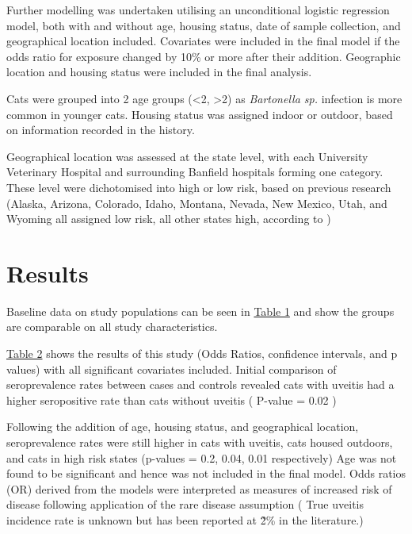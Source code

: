 \documentclass[11pt,twocolumn]{article}
\begin{document}
		Further modelling was undertaken utilising an unconditional logistic regression model, both with and without age, housing status, date of sample collection, and geographical location included. 
		Covariates were included in the final model if the odds ratio for exposure changed by 10\% or more after their addition.
		Geographic location and housing status were included in the final analysis.


		Cats were grouped into 2 age groups (\textless 2, \textgreater 2) as \emph{Bartonella sp.} infection is more common in younger cats.
		Housing status was assigned indoor or outdoor, based on information recorded in the history.


		Geographical location was assessed at the state level, with each University Veterinary Hospital and surrounding Banfield hospitals forming one category.
		These level were dichotomised into high or low risk, based on previous research (Alaska, Arizona, Colorado, Idaho, Montana, Nevada, New Mexico, Utah, and Wyoming all assigned low risk, all other states high, according to \cite{Jameson1995a})




\section{Results}


		Baseline data on study populations can be seen in \hyperref[tab:1]{Table 1} and show the groups are comparable on all study characteristics.


		\hyperref[tab:2]{Table 2} shows the results of this study (Odds Ratios, confidence intervals, and p values) with all significant covariates included.
		Initial comparison of seroprevalence rates between cases and controls revealed cats with uveitis had a higher seropositive rate than cats without uveitis ( P-value = 0.02 ) 


		Following the addition of age, housing status, and geographical location, seroprevalence rates were still higher in cats with uveitis, cats housed outdoors, and cats in high risk states (p-values = 0.2, 0.04, 0.01 respectively)
		Age was not found to be significant and hence was not included in the final model.
		Odds ratios (OR) derived from the models were interpreted as measures of increased risk of disease following application of the rare disease assumption ( True uveitis incidence rate is unknown but has been reported at \~ 2\% in the literature.)
\end{document}

